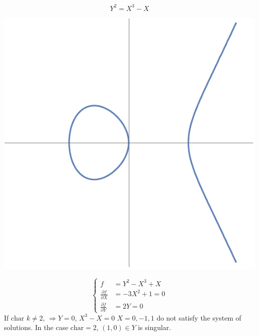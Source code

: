 \documentclass[11pt]{article}
\theoremstyle{definition}
\newcommand{\pd}{\partial}
\newcommand{\Lrta}{\Longrightarrow}
\begin{document}
$$Y^2=X^3-X$$
\begin{center}
\includegraphics[scale=0.5]{Y^2=X^3-X}
\end{center}
$$
\left\{ \begin{aligned}
f&=Y^2-X^3+X\\
\frac{\pd f}{\pd X}&=-3X^2+1=0\\
\frac{\pd f}{\pd Y}&=2Y=0
\end{aligned}\right.
$$
If $\text{char }k\neq 2$, $\Lrta Y=0$, $X^3-X=0$ $X=0,-1,1$ do not satisfy the system of solutions. In the case $\text{char}=2$, $(1,0)\in Y$ is singular.
\end{document}
